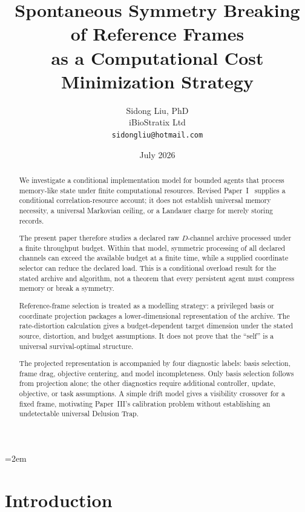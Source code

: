 \documentclass[12pt]{article}
\title{Spontaneous Symmetry Breaking of Reference Frames\\
as a Computational Cost Minimization Strategy}
\author{Sidong Liu, PhD \\
\small iBioStratix Ltd \\
\small \texttt{sidongliu@hotmail.com}}
\date{July 2026}
\begin{document}
\emergencystretch=2em
\raggedbottom
{}
\maketitle

\begin{abstract}
We investigate a conditional implementation model for bounded agents
that process memory-like state under finite computational resources.
Revised Paper~I~\cite{Liu2026TDOME_I} supplies a conditional
correlation-resource account; it does not establish universal memory
necessity, a universal Markovian ceiling, or a Landauer charge for
merely storing records.

The present paper therefore studies a declared raw $D$-channel archive
processed under a finite throughput budget.  Within that model,
symmetric processing of all declared channels can exceed the available
budget at a finite time, while a supplied coordinate selector can reduce
the declared load.  This is a conditional overload result for the stated
archive and algorithm, not a theorem that every persistent agent must
compress memory or break a symmetry.

Reference-frame selection is treated as a modelling strategy: a
privileged basis or coordinate projection packages a lower-dimensional
representation of the archive.  The rate-distortion calculation gives a
budget-dependent target dimension under the stated source, distortion,
and budget assumptions.  It does not prove that the ``self'' is a
universal survival-optimal structure.

The projected representation is accompanied by four diagnostic labels:
basis selection, frame drag, objective centering, and model
incompleteness.  Only basis selection follows from projection alone; the
other diagnostics require additional controller, update, objective, or
task assumptions.  A simple drift model gives a visibility crossover for
a fixed frame, motivating Paper~III's calibration problem without
establishing an undetectable universal Delusion Trap.
\end{abstract}

\section{Introduction}
\label{sec:intro}

\end{document}
